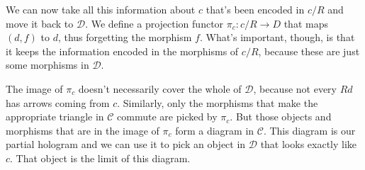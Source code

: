\documentclass[11pt]{amsart}
\newcommand{\cat}[1]{\mathcal{#1}}
\begin{document}
We can now take all this information about $c$ that's been encoded in $c/R$ and move it back to $\cat D$. We define a projection functor $\pi_c \colon c/R \to D$ that maps $(d, f)$ to $d$, thus forgetting the morphism $f$. What's important, though, is that it keeps the information encoded in the morphisms of $c/R$, because these are just some morphisms in $\cat D$.

\begin{figure}[H]
\end{figure}

The image of $\pi_c$ doesn't necessarily cover the whole of $\cat D$, because not every $R d$ has arrows coming from $c$. Similarly, only the morphisms that make the appropriate triangle in $\cat C$ commute are picked by $\pi_c$. But those objects and morphisms that are in the image of $\pi_c$ form a diagram in $\cat C$. This diagram is our partial hologram and we can use it to pick an object in $\cat D$ that looks exactly like $c$. That object is the limit of this diagram. 
\end{document}
